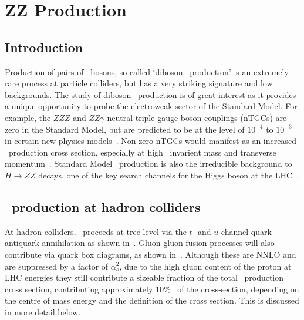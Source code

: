 \graphicspath{{Chapters/TheoryZZProduction/Figures/}}
\chapter{ZZ Production}
\label{chap:TheoryZZProduction}

\section{Introduction}

Production of pairs of \Z\ bosons, so called `diboson \ZZ\ production' is an
extremely rare process at particle colliders, but has a very striking signature
and low backgrounds. The study of diboson \ZZ\ production is of great interest
as it provides a unique opportunity to probe the electroweak sector of the
Standard Model. For example, the $ZZZ$ and $ZZ\gamma$ neutral triple gauge boson
couplings (nTGCs) are zero in the Standard Model, but are predicted to be at the
level of $10^{-4}$ to $10^{-3}$ in certain new-physics
models~\cite{Ellison:1998}. Non-zero nTGCs would manifest as an increased \ZZ\
production cross section, especially at high \ZZ\ invarient mass and transverse
momentum~\cite{Baur:2000ae}. Standard Model \ZZ\ production is also the irreducible background to $H \rightarrow ZZ$
decays, one of the key search channels for the Higgs boson at the LHC~\cite{HZZ4l_5fb:CERN-PH-EP-2012-014}.

\section{\ZZ\ production at hadron colliders}

At hadron colliders, \qqZZ\ proceeds at tree level via the $t$- and $u$-channel
quark-antiquark annihilation as shown in~\fig{theoryzz-fd-qqZZ}. 
Gluon-gluon fusion processes will also
contribute via quark box diagrams, as shown in~. Although
these are NNLO and are suppressed by a factor of
$\alpha_s^2$, due to the high gluon content of the proton at LHC energies they
still contribute a sizeable fraction of the total \ZZ\ production cross section,
contributing approximately 10\%~\cite{Campbell:2011} of the cross-section,
depending on the centre of mass energy and the definition of the cross section.
This is discussed in more detail below.

